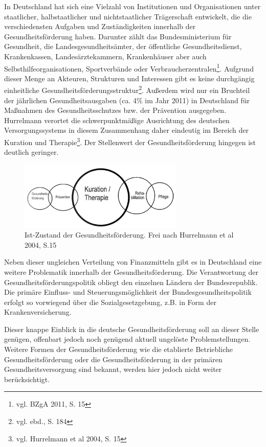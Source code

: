 In Deutschland hat sich eine Vielzahl von Institutionen und Organisationen unter staatlicher, halbstaatlicher und nichtstaatlicher Trägerschaft entwickelt, die die verschiedensten Aufgaben und Zuständigkeiten innerhalb der Gesundheitsförderung haben. Darunter zählt das Bundesministerium für Gesundheit, die Landesgesundheitsämter, der öffentliche Gesundheitsdienst, Krankenkassen, Landesärztekammern, Krankenhäuser aber auch Selbsthilfeorganisationen, Sportverbände oder Verbraucherzentralen\footnote{vgl. BZgA 2011, S. 15}. Aufgrund dieser Menge an Akteuren, Strukturen und Interessen gibt es keine durchgängig einheitliche Gesundheitsförderungsstruktur\footnote{vgl. ebd., S. 184}. Außerdem wird nur ein Bruchteil der jährlichen Gesundheitsausgaben (ca. 4\% im Jahr 2011) in Deutschland für Maßnahmen des Gesundheitsschutzes bzw. der Prävention ausgegeben. Hurrelmann verortet die schwerpunktmäßige Ausrichtung des deutschen Versorgungssystems in diesem Zusammenhang daher eindeutig im Bereich der Kuration und Therapie\footnote{vgl. Hurrelmann et al 2004, S. 15}. Der Stellenwert der Gesundheitsförderung hingegen ist deutlich geringer.

\begin{figure}[h]
	\centering
		\includegraphics[width=0.70\textwidth]{ist-soll2.png}
	\caption{Ist-Zustand der Gesundheitsförderung. Frei nach Hurrelmann et al 2004, S.15}
	\label{fig:ist-soll2}
\end{figure}

Neben dieser ungleichen Verteilung von Finanzmitteln gibt es in Deutschland eine weitere Problematik innerhalb der Gesundheitsförderung. Die Verantwortung der Gesundheitsförderungspolitik obliegt den einzelnen Ländern der Bundesrepublik. Die primäre Einfluss- und Steuerungsmöglichkeit der Bundesgesundheitspolitik erfolgt so vorwiegend über die Sozialgesetzgebung, z.B. in Form der Krankenversicherung.

Dieser knappe Einblick in die deutsche Gesundheitsförderung soll an dieser Stelle genügen, offenbart jedoch noch genügend aktuell ungelöste Problemstellungen. Weitere Formen der Gesundheitsförderung wie die etablierte Betriebliche Gesundheitsförderung oder die Gesundheitsförderung in der primären Gesundheitsversorgung sind bekannt, werden hier jedoch nicht weiter berücksichtigt.

